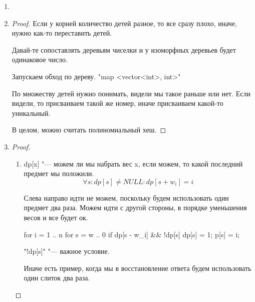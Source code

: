 \begin{enumerate}
\begin{proof}
k "--- размер поддерева.
$$\sum_{i, j} (p_i + w + q_j)^2 = \sum (p_i^2 + w^2 + q_j^2 + 2wp_i + 2wq_j + 2p_iq_j) = $$
$$ = (n - k)\sum p_i^2 + k \sum q_j^2 + k(n - k)w^2 + 2w(n - k) \sum p_i + 2wk\sum q_j + 2 \sum p_i q_j$$
$$\sum p_i q_j = \sum p_i \sum q_j$$
\end{proof}
\item
\item 
\begin{proof}
Если у корней количество детей разное, то все сразу плохо, иначе, нужно как-то переставить детей. 

Давай-те сопоставлять деревьям чиселки и у изоморфных деревьев будет одинаковое число. 

Запускаем обход по дереву. 
\cpp"map <vector<int>, int>"

По множеству детей нужно понимать, видели мы такое раньше или нет. Если видели, то присваиваем
такой же номер, иначе присваиваем какой-то уникальный.

В целом, можно считать полиномиальный хеш.  
\end{proof}  
\item 
\begin{proof}
    \begin{enumerate}
    \item 
    dp[x] "--- можем ли мы набрать вес x, если можем, то какой последний предмет мы положили.
    $$\forall s \colon dp[s] \ne NULL \colon dp[s + w_i] = i$$

    Слева направо идти не можем, поскольку будем использовать один предмет два раза. Можем идти с другой стороны, 
    в порядке уменьшения весов и все будет ок. 
    \begin{cppcode}
    for i = 1 .. n
        for s = w .. 0
            if dp[s - w_i] && !dp[s] {
                dp[s] = 1;
                p[s] = i;
            }
    \end{cppcode}

    \cpp"!dp[s]" "--- важное условие. 

    Иначе есть пример, когда мы в восстановление ответа будем использовать один слиток два раза. 
    \end{enumerate}

\end{proof}
\end{enumerate}
